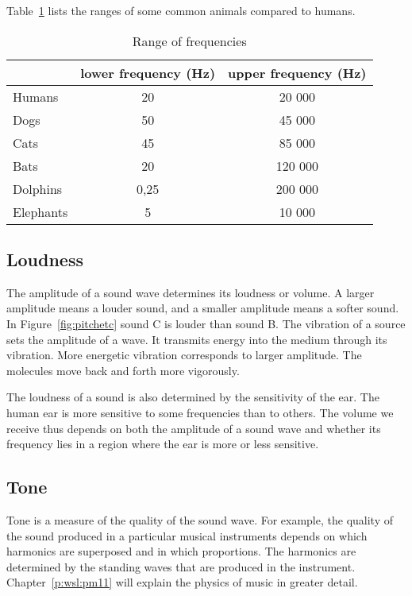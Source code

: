 Table~\ref{p:wsl:s11:rangeoff} lists the ranges of some common animals compared to humans.

\begin{table}[htbp]
\begin{center}
\caption{Range of frequencies }
\label{p:wsl:s11:rangeoff}
\begin{tabular}{|l|c|c|}\hline
&lower frequency (Hz) & upper frequency (Hz)\\\hline\hline
Humans & 20 & 20 000\\\hline
Dogs & 50 & 45 000\\\hline
Cats & 45 & 85 000\\\hline
Bats & 20 & 120 000\\\hline
Dolphins & 0,25 & 200 000\\\hline
Elephants & 5 & 10 000\\\hline
\hline
\end{tabular}
\end{center}
\end{table}


\subsection{Loudness}
The amplitude of a sound wave determines its loudness or volume. A larger amplitude means a louder sound, and a smaller amplitude means a softer sound. In Figure~\ref{fig:pitchetc} sound C is louder than sound B. The vibration of a source sets the amplitude of a wave. It transmits energy into the medium through its vibration. More energetic vibration corresponds to larger amplitude. The molecules move back and forth more vigorously.

The loudness of a sound is also determined by the sensitivity of the ear. The human ear is more sensitive to some frequencies than to others. The volume we receive thus depends on both the amplitude of a sound wave and whether its frequency lies in a region where the ear is more or less sensitive.

\subsection{Tone}
Tone is a measure of the quality of the sound wave. For example, the quality of the sound produced in a particular musical instruments depends on which
harmonics are superposed and in which proportions. The harmonics are determined by the standing waves that are produced in the instrument. Chapter~\ref{p:wsl:pm11} will explain the physics of music in greater detail.

